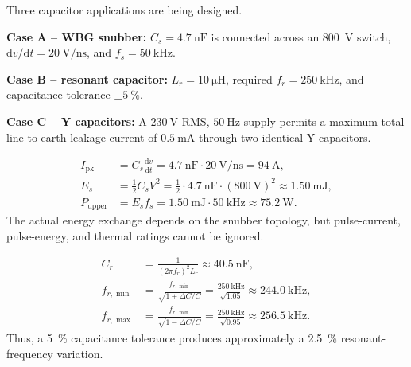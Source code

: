 Three capacitor applications are being designed. \newline

\textbf{Case A -- WBG snubber:} \newline
$C_s=\SI{4.7}{\nano\farad}$ is connected across an \SI{800}{\volt} switch,
$\mathrm{d}v/\mathrm{d}t=\SI{20}{\volt\per\nano\second}$, and
$f_s=\SI{50}{\kilo\hertz}$. \newline

\textbf{Case B -- resonant capacitor:} \newline
$L_r=\SI{10}{\micro\henry}$, required $f_r=\SI{250}{\kilo\hertz}$, and
capacitance tolerance $\pm\SI{5}{\percent}$. \newline

\textbf{Case C -- Y capacitors:} \newline
A $\SI{230}{\volt}$ RMS, $\SI{50}{\hertz}$ supply permits a maximum total
line-to-earth leakage current of $\SI{0.5}{\milli\ampere}$ through two identical
Y capacitors.


\begin{solutionblock}
    \begin{align}
        I_\mathrm{pk}&=C_s\frac{\mathrm{d}v}{\mathrm{d}t}
        =\SI{4.7}{\nano\farad}\cdot\SI{20}{\volt\per\nano\second}
        =\SI{94}{\ampere},\\
        E_s&=\frac{1}{2}C_sV^2
        =\frac{1}{2}\cdot\SI{4.7}{\nano\farad}\cdot(\SI{800}{\volt})^2
        \approx\SI{1.50}{\milli\joule},\\
        P_\mathrm{upper}&=E_sf_s
        =\SI{1.50}{\milli\joule}\cdot\SI{50}{\kilo\hertz}
        \approx\SI{75.2}{\watt}.
    \end{align}
    The actual energy exchange depends on the snubber topology, but pulse-current,
    pulse-energy, and thermal ratings cannot be ignored.
\end{solutionblock}


\begin{solutionblock}
    \begin{align}
        C_r&=\frac{1}{(2\pi f_r)^2L_r}
        \approx\SI{40.5}{\nano\farad},\\
        f_{r,\min}&=\frac{f_{r,\min}}{\sqrt{1+\Delta C/C}} = \frac{\SI{250}{\kilo\hertz}}{\sqrt{1.05}}
        \approx\SI{244.0}{\kilo\hertz},\\
        f_{r,\max}&=\frac{f_{r,\min}}{\sqrt{1-\Delta C/C}} = \frac{\SI{250}{\kilo\hertz}}{\sqrt{0.95}}
        \approx\SI{256.5}{\kilo\hertz}.
    \end{align}
    Thus, a \SI{5}{\percent} capacitance tolerance produces approximately a
    \SI{2.5}{\percent} resonant-frequency variation.
\end{solutionblock}

